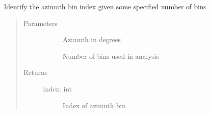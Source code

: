 \documentclass[letterpaper,10pt,english]{sphinxmanual}
\begin{document}
\begin{fulllineitems}
\label{\detokenize{stochprop.propagation:stochprop.propagation.find_azimuth_bin}}
\sphinxAtStartPar
Identify the azimuth bin index given some specified number of bins
\begin{quote}\begin{description}
\item[{Parameters}] \leavevmode\begin{description}
\item[{}] \leavevmode
\sphinxAtStartPar
Azimuth in degrees

\item[{}] \leavevmode
\sphinxAtStartPar
Number of bins used in analysis

\end{description}

\item[{Returns}] \leavevmode\begin{description}
\item[{index: int}] \leavevmode
\sphinxAtStartPar
Index of azimuth bin

\end{description}

\end{description}\end{quote}

\end{fulllineitems}

\end{document}
